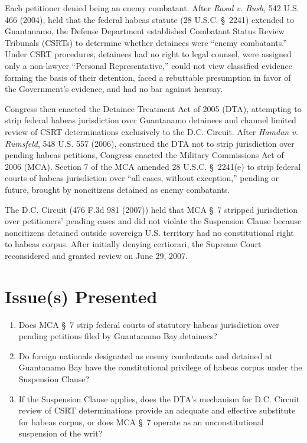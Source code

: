 \documentclass[12pt]{article}
\begin{document}
Each petitioner denied being an enemy combatant. After \textit{Rasul v. Bush}, 542 U.S. 466 (2004), held that the federal habeas statute (28 U.S.C. \S~2241) extended to Guantanamo, the Defense Department established Combatant Status Review Tribunals (CSRTs) to determine whether detainees were ``enemy combatants.'' Under CSRT procedures, detainees had no right to legal counsel, were assigned only a non-lawyer ``Personal Representative,'' could not view classified evidence forming the basis of their detention, faced a rebuttable presumption in favor of the Government's evidence, and had no bar against hearsay.

Congress then enacted the Detainee Treatment Act of 2005 (DTA), attempting to strip federal habeas jurisdiction over Guantanamo detainees and channel limited review of CSRT determinations exclusively to the D.C. Circuit. After \textit{Hamdan v. Rumsfeld}, 548 U.S. 557 (2006), construed the DTA not to strip jurisdiction over pending habeas petitions, Congress enacted the Military Commissions Act of 2006 (MCA). Section 7 of the MCA amended 28 U.S.C. \S~2241(e) to strip federal courts of habeas jurisdiction over ``all cases, without exception,'' pending or future, brought by noncitizens detained as enemy combatants.

The D.C. Circuit (476 F.3d 981 (2007)) held that MCA \S~7 stripped jurisdiction over petitioners' pending cases and did not violate the Suspension Clause because noncitizens detained outside sovereign U.S. territory had no constitutional right to habeas corpus. After initially denying certiorari, the Supreme Court reconsidered and granted review on June 29, 2007.

\section{Issue(s) Presented}
\begin{enumerate}
  \item Does MCA \S~7 strip federal courts of statutory habeas jurisdiction over pending petitions filed by Guantanamo Bay detainees?
  \item Do foreign nationals designated as enemy combatants and detained at Guantanamo Bay have the constitutional privilege of habeas corpus under the Suspension Clause?
  \item If the Suspension Clause applies, does the DTA's mechanism for D.C. Circuit review of CSRT determinations provide an adequate and effective substitute for habeas corpus, or does MCA \S~7 operate as an unconstitutional suspension of the writ?
\end{enumerate}
\end{document}
